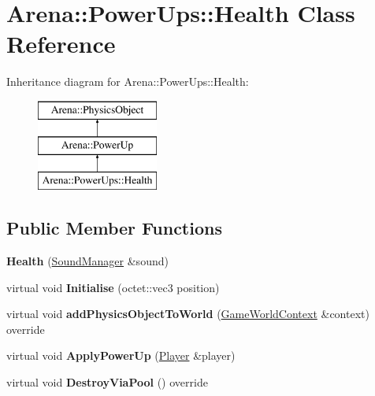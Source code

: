 \hypertarget{class_arena_1_1_power_ups_1_1_health}{\section{Arena\+:\+:Power\+Ups\+:\+:Health Class Reference}
\label{class_arena_1_1_power_ups_1_1_health}
}
Inheritance diagram for Arena\+:\+:Power\+Ups\+:\+:Health\+:\begin{figure}[H]
\begin{center}
\leavevmode
\includegraphics[height=3.000000cm]{class_arena_1_1_power_ups_1_1_health}
\end{center}
\end{figure}
\subsection*{Public Member Functions}
\begin{DoxyCompactItemize}
\item 
\hypertarget{class_arena_1_1_power_ups_1_1_health_a340c186df737b9b2539d74d62b249682}{{\bfseries Health} (\hyperlink{class_arena_1_1_sound_manager}{Sound\+Manager} \&sound)}\label{class_arena_1_1_power_ups_1_1_health_a340c186df737b9b2539d74d62b249682}

\item 
\hypertarget{class_arena_1_1_power_ups_1_1_health_ad85999098dfc4a68155f5fcb475c8243}{virtual void {\bfseries Initialise} (octet\+::vec3 position)}\label{class_arena_1_1_power_ups_1_1_health_ad85999098dfc4a68155f5fcb475c8243}

\item 
\hypertarget{class_arena_1_1_power_ups_1_1_health_a42a3054c97c611cacc448a94af2ecd71}{virtual void {\bfseries add\+Physics\+Object\+To\+World} (\hyperlink{struct_arena_1_1_game_world_context}{Game\+World\+Context} \&context) override}\label{class_arena_1_1_power_ups_1_1_health_a42a3054c97c611cacc448a94af2ecd71}

\item 
\hypertarget{class_arena_1_1_power_ups_1_1_health_afe88bd00520c6618fa85a7130c955d09}{virtual void {\bfseries Apply\+Power\+Up} (\hyperlink{class_arena_1_1_player}{Player} \&player)}\label{class_arena_1_1_power_ups_1_1_health_afe88bd00520c6618fa85a7130c955d09}

\item 
\hypertarget{class_arena_1_1_power_ups_1_1_health_a8db1b4d9d1783ddc1da11e878e9d135d}{virtual void {\bfseries Destroy\+Via\+Pool} () override}\label{class_arena_1_1_power_ups_1_1_health_a8db1b4d9d1783ddc1da11e878e9d135d}

\end{DoxyCompactItemize}
